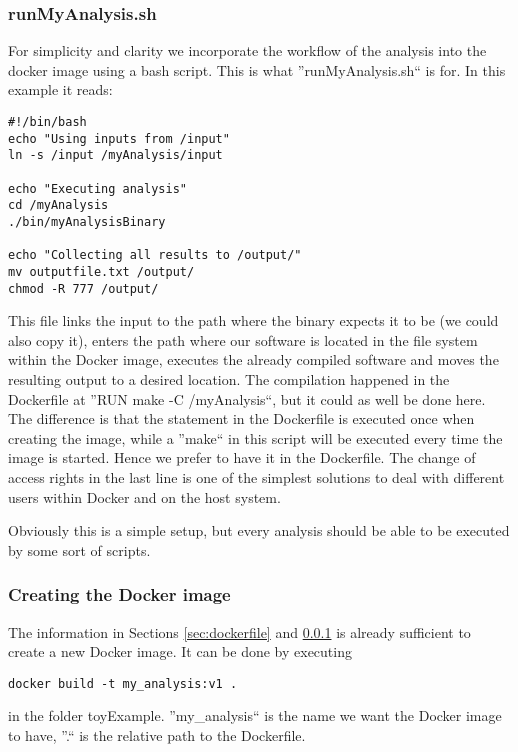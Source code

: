 \documentclass[a4paper, twoside, 11pt]{article}
\begin{document}
\subsubsection{runMyAnalysis.sh}
\label{sec:runmyanalysis}
For simplicity and clarity we incorporate the workflow of the analysis 
into the docker image using a bash script. 
This is what ''runMyAnalysis.sh`` is for. In this example it reads:
\begin{lstlisting}[basicstyle=\ttfamily\small,upquote=true,columns=flexible,keepspaces=true,frame=single]
#!/bin/bash
echo "Using inputs from /input"
ln -s /input /myAnalysis/input

echo "Executing analysis"
cd /myAnalysis
./bin/myAnalysisBinary

echo "Collecting all results to /output/"
mv outputfile.txt /output/
chmod -R 777 /output/
\end{lstlisting}
This file links the input to the path where the binary expects it to be 
(we could also copy it), 
enters the path where our software is located in 
the file system within the Docker image, 
executes the already compiled software 
and moves the resulting output to a desired location.
The compilation happened in the Dockerfile at ''RUN make -C /myAnalysis``, 
but it could as well be done here.
The difference is that the statement in the Dockerfile 
is executed once when creating the image, while a ''make`` in this script will be executed 
every time the image is started. 
Hence we prefer to have it in the Dockerfile. 
The change of access rights in the last line is one of the simplest solutions 
to deal with different users within Docker and on the host system. 

Obviously this is a simple setup, but every analysis should be able to be executed by some sort of scripts. 

\subsubsection{Creating the Docker image}
\label{sec:createImage}
The information in Sections \ref{sec:dockerfile} and \ref{sec:runmyanalysis} 
is already sufficient to create a new Docker image. 
It can be done by executing
\begin{lstlisting}[basicstyle=\ttfamily\small,upquote=true,columns=flexible,keepspaces=true,frame=single]
docker build -t my_analysis:v1 .
\end{lstlisting}
in the folder toyExample. 
''my\_analysis`` is the name we want the Docker image to have, 
''.`` is the relative path to the Dockerfile.
\end{document}
